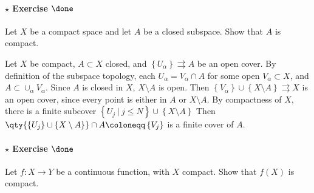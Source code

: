 \hypertarget{star-exercise-done}{%
\paragraph{\texorpdfstring{\(\star\) Exercise
\(\done\)}{\textbackslash star Exercise \textbackslash done}}\label{star-exercise-done}}

Let \(X\) be a compact space and let \(A\) be a closed subspace. Show
that \(A\) is compact.

\begin{solution}

\hfill

\begin{concept}

\hfill

\end{concept}

Let \(X\) be compact, \(A\subset X\) closed, and
\(\left\{{U_\alpha}\right\} \rightrightarrows A\) be an open cover. By
definition of the subspace topology, each \(U_\alpha = V_\alpha \cap A\)
for some open \(V_\alpha \subset X\), and
\(A\subset \cup_\alpha V_\alpha\). Since \(A\) is closed in \(X\),
\(X\setminus A\) is open. Then
\(\left\{{V_\alpha}\right\}\cup\left\{{X\setminus A}\right\}\rightrightarrows X\)
is an open cover, since every point is either in \(A\) or
\(X\setminus A\). By compactness of \(X\), there is a finite subcover
\(\left\{{U_j {~\mathrel{\Big|}~}j\leq N}\right\}\cup\left\{{X\setminus A}\right\}\)
Then
\(\qty{\left\{{U_j}\right\} \cup\left\{{X\setminus A}\right\}} \cap A \coloneqq\left\{{V_j}\right\}\)
is a finite cover of \(A\).

\end{solution}

\hypertarget{star-exercise-done-1}{%
\paragraph{\texorpdfstring{\(\star\) Exercise
\(\done\)}{\textbackslash star Exercise \textbackslash done}}\label{star-exercise-done-1}}

Let \(f : X \to Y\) be a continuous function, with \(X\) compact. Show
that \(f(X)\) is compact.


